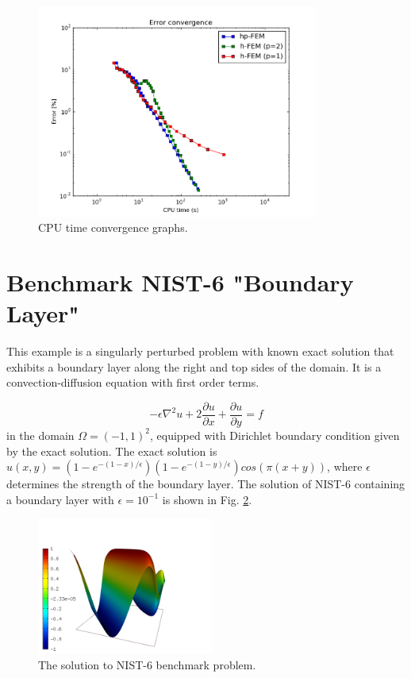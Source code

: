 \documentclass[12pt]{elsarticle}
\begin{document}
\begin{figure}[H]
\centering
\vspace{-8mm}
\includegraphics[height=7cm]{nist/nist-5/conv_cpu_aniso.png}
\caption{CPU time convergence graphs.}
\label{fig:nist-5-conv-cpu}
\end{figure}


\section{Benchmark NIST-6 "Boundary Layer"}
\label{sec:bench-6}

This example is a singularly perturbed problem with known exact solution that exhibits
a boundary layer along the right and top sides of the domain.
It is a convection-diffusion equation with first order terms.

\begin{equation} \label{boundary-layer}
-\epsilon \nabla^{2} u + 2\frac{\partial u}{\partial x} + \frac{\partial u}{\partial y} = f
\end{equation}
in the domain $\Omega = (-1, 1)^2$, equipped with Dirichlet boundary condition
given by the exact solution. The exact solution is
$u(x,y) = (1 - e^{-(1 - x) / \epsilon})(1 - e^{-(1 - y) / \epsilon})cos(\pi (x + y))$,
where $\epsilon$ determines the strength of the boundary layer.
The solution of NIST-6 containing a boundary layer
with $\epsilon = 10^{-1}$ is shown in Fig. \ref{fig:sln-nist06}.

\begin{figure}[H]
\centering
\vspace{-3mm}
\includegraphics[height=4.5cm]{nist/nist-6/solution.png}
\caption{The solution to NIST-6 benchmark problem.}
\vspace{-3mm}
\label{fig:sln-nist06}
\end{figure}
\end{document}

